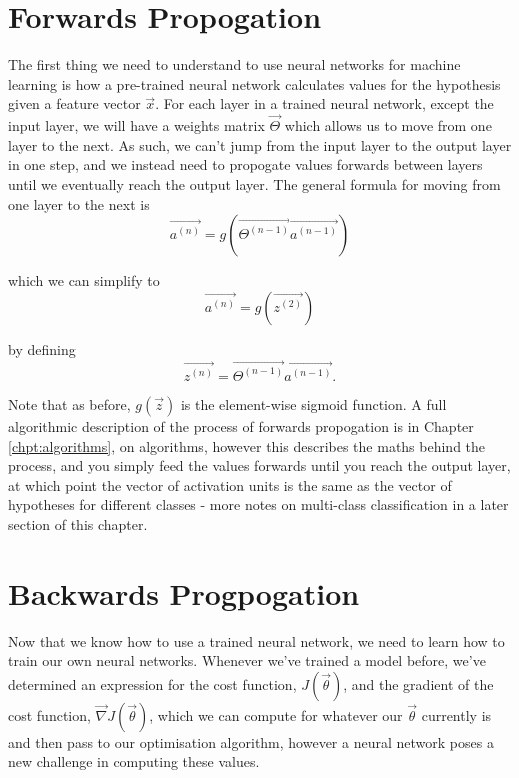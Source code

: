 \section{Forwards Propogation}

The first thing we need to understand to use neural networks for machine learning is how a pre-trained neural network calculates values for the hypothesis
given a feature vector $\vec{x}$. For each layer in a trained neural network, except the input layer, we will have a weights matrix $\vec{\Theta}$ which
allows us to move from one layer to the next. As such, we can't jump from the input layer to the output layer in one step, and we instead need to propogate
values forwards between layers until we eventually reach the output layer. The general formula for moving from one layer to the next is
\begin{equation}
    \vec{a^{(n)}} = g(\vec{\Theta^{(n-1)}} \vec{a^{(n-1)}})
\end{equation}

which we can simplify to
\begin{equation}
    \vec{a^{(n)}} = g(\vec{z^{(2)}})
\end{equation}

by defining
\begin{equation}
    \vec{z^{(n)}} = \vec{\Theta^{(n-1)}} \vec{a^{(n-1)}}.
\end{equation}

Note that as before, $g(\vec{z})$ is the element-wise sigmoid function. A full algorithmic description of the process of forwards propogation is in Chapter
\ref{chpt:algorithms}, on algorithms, however this describes the maths behind the process, and you simply feed the values forwards until you reach the output
layer, at which point the vector of activation units is the same as the vector of hypotheses for different classes - more notes on multi-class classification
in a later section of this chapter.

\section{Backwards Progpogation}

Now that we know how to use a trained neural network, we need to learn how to train our own neural networks. Whenever we've trained a model before, we've
determined an expression for the cost function, $J(\vec{\theta})$, and the gradient of the cost function, $\vec{\nabla} J(\vec{\theta})$, which we can compute
for whatever our $\vec{\theta}$ currently is and then pass to our optimisation algorithm, however a neural network poses a new challenge in computing these
values.

